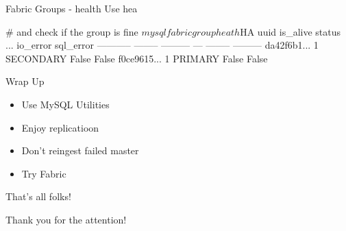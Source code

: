 \documentclass{beamer}[10]
\begin{document}
\begin{pyframe}{Fabric Groups - health}
Use hea
\begin{bashcode}

# and check if the group is fine
$ mysqlfabric group heath $HA
       uuid is_alive    status ... io_error sql_error
----------- -------- --------- --- -------- ---------
da42f6b1...        1 SECONDARY        False     False
f0ce9615...        1   PRIMARY        False     False
\end{bashcode}
\end{pyframe}




\begin{pyframe}{Wrap Up}
\begin{itemize}
\item Use MySQL Utilities
\item Enjoy replicatioon
\item Don't reingest failed master
\item Try Fabric
\end{itemize}
\end{pyframe}

\begin{pyframe}{That's all folks!}
\begin{center}
Thank you for the attention! \\\\
\insertauthor
\end{center}
\end{pyframe}
\end{document}
